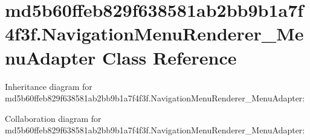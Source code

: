 \hypertarget{classmd5b60ffeb829f638581ab2bb9b1a7f4f3f_1_1_navigation_menu_renderer___menu_adapter}{}\section{md5b60ffeb829f638581ab2bb9b1a7f4f3f.\+Navigation\+Menu\+Renderer\+\_\+\+Menu\+Adapter Class Reference}
\label{classmd5b60ffeb829f638581ab2bb9b1a7f4f3f_1_1_navigation_menu_renderer___menu_adapter}


Inheritance diagram for md5b60ffeb829f638581ab2bb9b1a7f4f3f.\+Navigation\+Menu\+Renderer\+\_\+\+Menu\+Adapter\+:


Collaboration diagram for md5b60ffeb829f638581ab2bb9b1a7f4f3f.\+Navigation\+Menu\+Renderer\+\_\+\+Menu\+Adapter\+:
